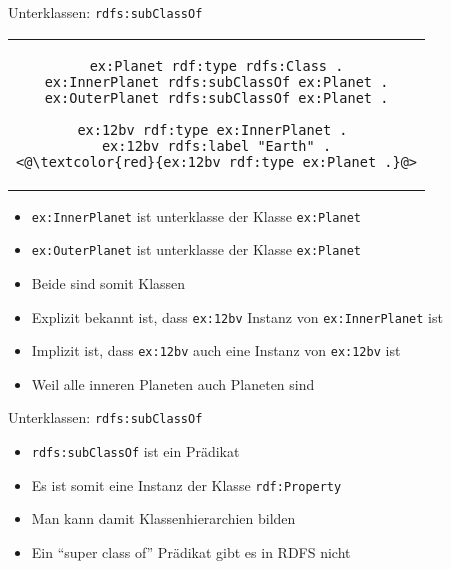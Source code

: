 \documentclass{beamer}
\begin{document}
\begin{frame}[fragile]{Unterklassen: \texttt{rdfs:subClassOf}}
	
	\begin{center}
		\begin{tabular}{c}
			\begin{lstlisting}
ex:Planet rdf:type rdfs:Class .
ex:InnerPlanet rdfs:subClassOf ex:Planet .
ex:OuterPlanet rdfs:subClassOf ex:Planet .

ex:12bv rdf:type ex:InnerPlanet . 
ex:12bv rdfs:label "Earth" .
<@\textcolor{red}{ex:12bv rdf:type ex:Planet .}@>
			\end{lstlisting}
		\end{tabular}
	\end{center}
	
	\begin{itemize}
		\item \texttt{ex:InnerPlanet} ist unterklasse der Klasse \texttt{ex:Planet}
		\item \texttt{ex:OuterPlanet} ist unterklasse der Klasse \texttt{ex:Planet}
		\item Beide sind somit Klassen
		\item Explizit bekannt ist, dass \texttt{ex:12bv} Instanz von \texttt{ex:InnerPlanet} ist
		\item Implizit ist, dass \texttt{ex:12bv} auch eine Instanz von \texttt{ex:12bv} ist
		\item Weil alle inneren Planeten auch Planeten sind
	\end{itemize}
	
\end{frame}

\begin{frame}{Unterklassen: \texttt{rdfs:subClassOf}}
	
	\begin{itemize}
		\item \texttt{rdfs:subClassOf} ist ein Prädikat
		\item Es ist somit eine Instanz der Klasse \texttt{rdf:Property}
		\item Man kann damit Klassenhierarchien bilden
		\item Ein ``super class of'' Prädikat gibt es in RDFS nicht
	\end{itemize}
	
\end{frame}
\end{document}
